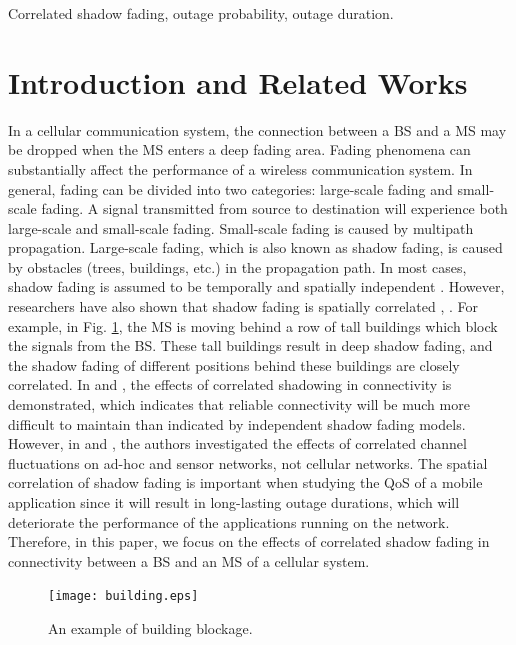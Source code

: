 \documentclass[journal,10pt]{IEEEtran}
\begin{document}
\begin{IEEEkeywords}
Correlated shadow fading, outage probability, outage duration.
\end{IEEEkeywords}

\section{Introduction and Related Works}

\par In a cellular communication system, the connection between a BS and a MS may be dropped when the MS enters a deep fading area. Fading phenomena can substantially affect the performance of a wireless communication system. In general, fading can be divided into two categories: large-scale fading and small-scale fading. A signal transmitted from source to destination will experience both large-scale and small-scale fading. Small-scale fading is caused by multipath propagation. Large-scale fading, which is also known as shadow fading, is caused by obstacles (trees, buildings, etc.) in the propagation path. In most cases, shadow fading is assumed to be temporally and spatially independent \cite{rappaport1996wireless}.  However, researchers have also shown that shadow fading is spatially correlated \cite{gudmundson1991correlation}, \cite{zhang2008novel}. For example, in Fig. \ref{building}, the MS is moving behind a row of tall buildings which block the signals from the BS. These tall buildings result in deep shadow fading, and the shadow fading of different positions behind these buildings are closely correlated. In \cite{fabbri2009impact} and \cite{patwari2008effects}, the effects of correlated shadowing in connectivity is demonstrated, which indicates that reliable connectivity will be much more difficult to maintain than indicated by independent shadow fading models. However, in \cite{fabbri2009impact} and \cite{patwari2008effects}, the authors investigated the effects of correlated channel fluctuations on ad-hoc and sensor networks, not cellular networks. The spatial correlation of shadow fading is important when studying the QoS of a mobile application since it will result in long-lasting outage durations, which will deteriorate the performance of the applications running on the network. Therefore, in this paper, we focus on the effects of correlated shadow fading in connectivity between a BS and an MS of a cellular system.
\begin{figure}
\centering
\texttt{[image: building.eps]}
\caption{An example of building blockage.}
\label{building}
\end{figure}
\end{document}

